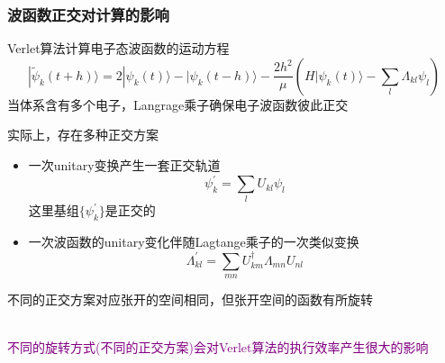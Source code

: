 {\frame
{
	\frametitle{波函数正交对计算的影响}
	{\fontsize{9.0pt}{5.2pt}\selectfont
	\textrm{Verlet}算法计算电子态波函数的运动方程
	\begin{displaymath}
		|\tilde\psi_k(t+h)\rangle=2|\psi_k(t)\rangle-|\psi_k(t-h)\rangle-\dfrac{2h^2}{\mu}(H|\psi_k(t)\rangle-\sum_l\Lambda_{kl}\psi_l)
	\end{displaymath}}
	当体系含有多个电子，\textrm{Langrage}乘子确保电子波函数彼此正交\\%
	{\fontsize{7.0pt}{5.2pt}\selectfont
	实际上，存在多种正交方案
	\begin{itemize}
		\item 一次\textrm{unitary}变换产生一套正交轨道
			\begin{displaymath}
				\psi_k^{\prime}=\sum_lU_{kl}\psi_l
			\end{displaymath}
			这里基组$\{\psi_k^{\prime}\}$是正交的
		\item 一次波函数的\textrm{unitary}变化伴随\textrm{Lagtange}乘子的一次类似变换
			\begin{displaymath}
				\Lambda_{kl}^{\prime}=\sum_{mn}U_{km}^{\dagger}\Lambda_{mn}U_{nl}
			\end{displaymath}
	\end{itemize}
	不同的正交方案对应张开的空间相同，但张开空间的函数有所旋转
}\\
	{\fontsize{8.0pt}{5.2pt}\selectfont
	\textcolor{purple}{不同的旋转方式(不同的正交方案)会对\textrm{Verlet}算法的执行效率产生很大的影响}
}
	{\fontsize{9.0pt}{5.2pt}\selectfont
}
}

}
